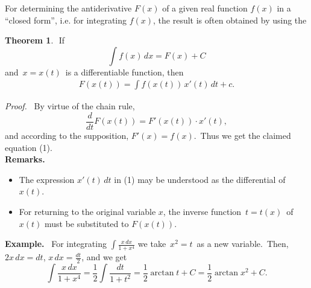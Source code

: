 \documentclass[12pt]{article}
\theoremstyle{definition}
\newtheorem*{thmplain}{Theorem}
\begin{document}
For determining the antiderivative $F(x)$ of a given real function $f(x)$ in a  ``closed form'', i.e. for integrating $f(x)$, the result is often obtained by using the

\begin{thmplain}
\,\,If 
      $$\int f(x)\,dx = F(x)+C$$
and \,$x = x(t)$\, is a differentiable function,
then
\begin{align}
     F(x(t)) = \int f(x(t))\,x'(t)\,dt+c.
\end{align}
\end{thmplain}

{\em Proof.} \, By virtue of the chain rule,
   $$\frac{d}{dt}F(x(t)) = F'(x(t))\cdot x'(t),$$
and according to the supposition, $F'(x) = f(x)$. \,Thus we get the claimed equation (1).\\

\textbf{Remarks.}
\begin{itemize}
 \item The expression $x'(t)\,dt$ in (1) may be understood as the differential of $x(t)$.
 \item For returning to the original variable $x$, the inverse function \,$t = t(x)$\, of $x(t)$ must be substituted to $F(x(t))$.\\
\end{itemize}

\textbf{Example.} \, For integrating $\int \frac{x\,dx}{1+x^4}$ we take \,$x^2 = t$\, as a new variable. \,Then, \,$2x\,dx = dt$, $x\,dx = \frac{dt}{2}$, and we get
$$\int \frac{x\,dx}{1+x^4} = \frac{1}{2}\int \frac{dt}{1+t^2} = \frac{1}{2}\arctan t+ C= \frac{1}{2}\arctan x^2+C.$$
\end{document}
